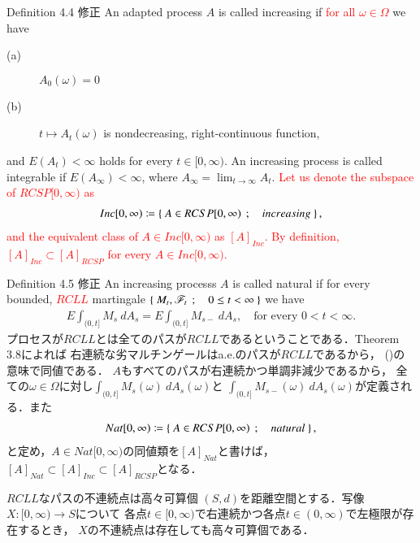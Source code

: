 	\begin{itembox}[l]{Definition 4.4 修正}
		An adapted process $A$ is called increasing if \textcolor{red}{for all $\omega \in \Omega$} we have
		\begin{description}
			\item[(a)] $A_0(\omega) = 0$
			\item[(b)] $t \longmapsto A_t(\omega)$ is nondecreasing, right-continuous function,
		\end{description}
		and $E(A_t) < \infty$ holds for every $t \in [0,\infty)$.
		An increasing process is called integrable if $E(A_\infty) < \infty$,
		where $A_\infty = \lim_{t \to \infty} A_t$.
		\textcolor{red}{Let us denote the subspace of $RCSP[0,\infty)$ as
		\begin{align}
			Inc[0,\infty) \coloneqq 
			\left\{\ A \in RCSP[0,\infty)\ \, ; \quad increasing\ \right\},
		\end{align}
		and the equivalent class of $A \in Inc[0,\infty)$ as $[A]_{Inc}$.
		By definition, $[A]_{Inc} \subset [A]_{RCSP}$ for every $A \in Inc[0,\infty)$.}
	\end{itembox}
	
	\begin{itembox}[l]{Definition 4.5 修正}
		An increasing processs $A$ is called natural if for every bounded, 
		\textcolor{red}{$RCLL$} martingale $\left\{\ M_t,\mathscr{F}_t\ \, ; \quad 0 \leq t < \infty\ \right\}$ we have
		\begin{align}
			E \int_{(0,t]} M_s\ dA_s = E \int_{(0,t]} M_{s-}\ dA_s,
			\quad \mbox{for every $0 < t < \infty$}.
		\end{align}
		プロセスが$RCLL$とは全てのパスが$RCLL$であるということである．Theorem 3.8によれば
		右連続な劣マルチンゲールはa.e.のパスが$RCLL$であるから，
		()の意味で同値である．
		$A$もすべてのパスが右連続かつ単調非減少であるから，
		全ての$\omega \in \Omega$に対し$\int_{(0,t]} M_s(\omega)\ dA_s(\omega)$と
		$\int_{(0,t]} M_{s-}(\omega)\ dA_s(\omega)$が定義される．また
		\begin{align}
			Nat[0,\infty) \coloneqq
			\left\{\ A \in RCSP[0,\infty)\ \, ; \quad natural\ \right\},
		\end{align}
		と定め，$A \in Nat[0,\infty)$の同値類を$[A]_{Nat}$と書けば，
		$[A]_{Nat} \subset [A]_{Inc} \subset [A]_{RCSP}$となる．
	\end{itembox}
	
	\begin{itembox}[l]{$RCLL$なパスの不連続点は高々可算個}
		$(S,d)$を距離空間とする．写像$X:[0,\infty) \longrightarrow S$について
		各点$t \in [0,\infty)$で右連続かつ各点$t \in (0,\infty)$で左極限が存在するとき，
		$X$の不連続点は存在しても高々可算個である．
	\end{itembox}
	
